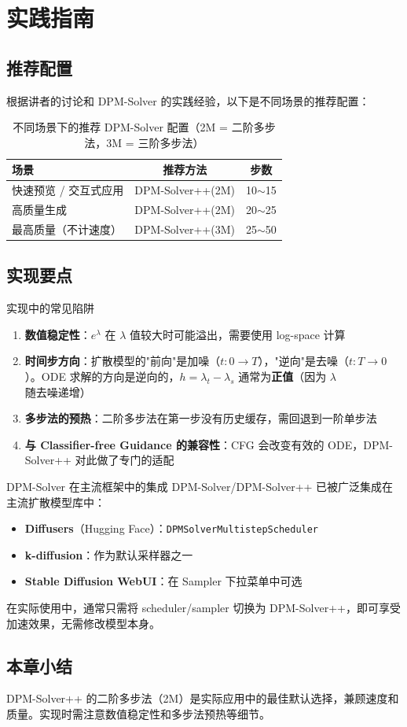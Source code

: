 \section{实践指南}

\subsection{推荐配置}

根据讲者的讨论和 DPM-Solver 的实践经验，以下是不同场景的推荐配置：

\begin{table}[H]
\centering
\begin{tabular}{lcc}
\toprule
\textbf{场景} & \textbf{推荐方法} & \textbf{步数} \\
\midrule
快速预览 / 交互式应用 & DPM-Solver++(2M) & 10$\sim$15 \\
高质量生成 & DPM-Solver++(2M) & 20$\sim$25 \\
最高质量（不计速度） & DPM-Solver++(3M) & 25$\sim$50 \\
\bottomrule
\end{tabular}
\caption{不同场景下的推荐 DPM-Solver 配置（2M = 二阶多步法，3M = 三阶多步法）}
\end{table}

\subsection{实现要点}

\begin{warningbox}{实现中的常见陷阱}
\begin{enumerate}
    \item \textbf{数值稳定性}：$e^{\lambda}$ 在 $\lambda$ 值较大时可能溢出，需要使用 log-space 计算
    \item \textbf{时间步方向}：扩散模型的"前向"是加噪（$t: 0 \to T$），"逆向"是去噪（$t: T \to 0$）。ODE 求解的方向是逆向的，$h = \lambda_t - \lambda_s$ 通常为\textbf{正值}（因为 $\lambda$ 随去噪递增）
    \item \textbf{多步法的预热}：二阶多步法在第一步没有历史缓存，需回退到一阶单步法
    \item \textbf{与 Classifier-free Guidance 的兼容性}：CFG 会改变有效的 ODE，DPM-Solver++ 对此做了专门的适配
\end{enumerate}
\end{warningbox}

\begin{knowledgebox}{DPM-Solver 在主流框架中的集成}
DPM-Solver/DPM-Solver++ 已被广泛集成在主流扩散模型库中：
\begin{itemize}
    \item \textbf{Diffusers}（Hugging Face）：\texttt{DPMSolverMultistepScheduler}
    \item \textbf{k-diffusion}：作为默认采样器之一
    \item \textbf{Stable Diffusion WebUI}：在 Sampler 下拉菜单中可选
\end{itemize}
在实际使用中，通常只需将 scheduler/sampler 切换为 DPM-Solver++，即可享受加速效果，无需修改模型本身。
\end{knowledgebox}

\subsection{本章小结}

DPM-Solver++ 的二阶多步法（2M）是实际应用中的最佳默认选择，兼顾速度和质量。实现时需注意数值稳定性和多步法预热等细节。


